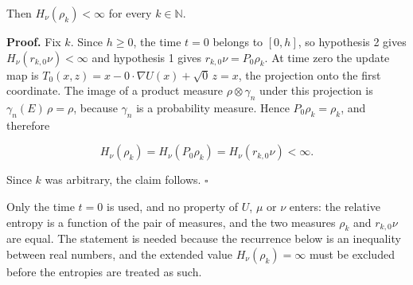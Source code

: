 \documentclass[11pt,a4paper]{report}
\begin{document}
Then \(H_\nu(\rho_k)<\infty\) for every \(k\in\mathbb N\).




\textbf{Proof.} Fix \(k\). Since \(h\ge0\), the time \(t=0\) belongs to \([0,h]\), so hypothesis 2 gives \(H_\nu(r_{k,0}\nu)<\infty\) and hypothesis 1 gives \(r_{k,0}\nu=P_0\rho_k\). At time zero the update map is \(T_0(x,z)=x-0\cdot\nabla U(x)+\sqrt0\,z=x\), the projection onto the first coordinate. The image of a product measure \(\rho\otimes\gamma_n\) under this projection is \(\gamma_n(E)\,\rho=\rho\), because \(\gamma_n\) is a probability measure. Hence \(P_0\rho_k=\rho_k\), and therefore


\[H_\nu(\rho_k)=H_\nu(P_0\rho_k)=H_\nu(r_{k,0}\nu)<\infty.\]


Since \(k\) was arbitrary, the claim follows. \(\square\)




Only the time \(t=0\) is used, and no property of \(U\), \(\mu\) or \(\nu\) enters: the relative entropy is a function of the pair of measures, and the two measures \(\rho_k\) and \(r_{k,0}\nu\) are equal. The statement is needed because the recurrence below is an inequality between real numbers, and the extended value \(H_\nu(\rho_k)=\infty\) must be excluded before the entropies are treated as such.
\end{document}
